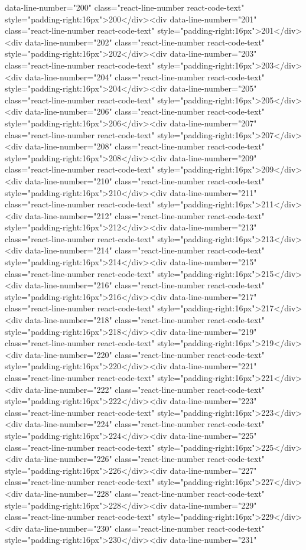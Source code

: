 {{{{{{{data-line-number="200" class="react-line-number react-code-text" style="padding-right:16px">200</div><div data-line-number="201" class="react-line-number react-code-text" style="padding-right:16px">201</div><div data-line-number="202" class="react-line-number react-code-text" style="padding-right:16px">202</div><div data-line-number="203" class="react-line-number react-code-text" style="padding-right:16px">203</div><div data-line-number="204" class="react-line-number react-code-text" style="padding-right:16px">204</div><div data-line-number="205" class="react-line-number react-code-text" style="padding-right:16px">205</div><div data-line-number="206" class="react-line-number react-code-text" style="padding-right:16px">206</div><div data-line-number="207" class="react-line-number react-code-text" style="padding-right:16px">207</div><div data-line-number="208" class="react-line-number react-code-text" style="padding-right:16px">208</div><div data-line-number="209" class="react-line-number react-code-text" style="padding-right:16px">209</div><div data-line-number="210" class="react-line-number react-code-text" style="padding-right:16px">210</div><div data-line-number="211" class="react-line-number react-code-text" style="padding-right:16px">211</div><div data-line-number="212" class="react-line-number react-code-text" style="padding-right:16px">212</div><div data-line-number="213" class="react-line-number react-code-text" style="padding-right:16px">213</div><div data-line-number="214" class="react-line-number react-code-text" style="padding-right:16px">214</div><div data-line-number="215" class="react-line-number react-code-text" style="padding-right:16px">215</div><div data-line-number="216" class="react-line-number react-code-text" style="padding-right:16px">216</div><div data-line-number="217" class="react-line-number react-code-text" style="padding-right:16px">217</div><div data-line-number="218" class="react-line-number react-code-text" style="padding-right:16px">218</div><div data-line-number="219" class="react-line-number react-code-text" style="padding-right:16px">219</div><div data-line-number="220" class="react-line-number react-code-text" style="padding-right:16px">220</div><div data-line-number="221" class="react-line-number react-code-text" style="padding-right:16px">221</div><div data-line-number="222" class="react-line-number react-code-text" style="padding-right:16px">222</div><div data-line-number="223" class="react-line-number react-code-text" style="padding-right:16px">223</div><div data-line-number="224" class="react-line-number react-code-text" style="padding-right:16px">224</div><div data-line-number="225" class="react-line-number react-code-text" style="padding-right:16px">225</div><div data-line-number="226" class="react-line-number react-code-text" style="padding-right:16px">226</div><div data-line-number="227" class="react-line-number react-code-text" style="padding-right:16px">227</div><div data-line-number="228" class="react-line-number react-code-text" style="padding-right:16px">228</div><div data-line-number="229" class="react-line-number react-code-text" style="padding-right:16px">229</div><div data-line-number="230" class="react-line-number react-code-text" style="padding-right:16px">230</div><div data-line-number="231" }}}}}}}
